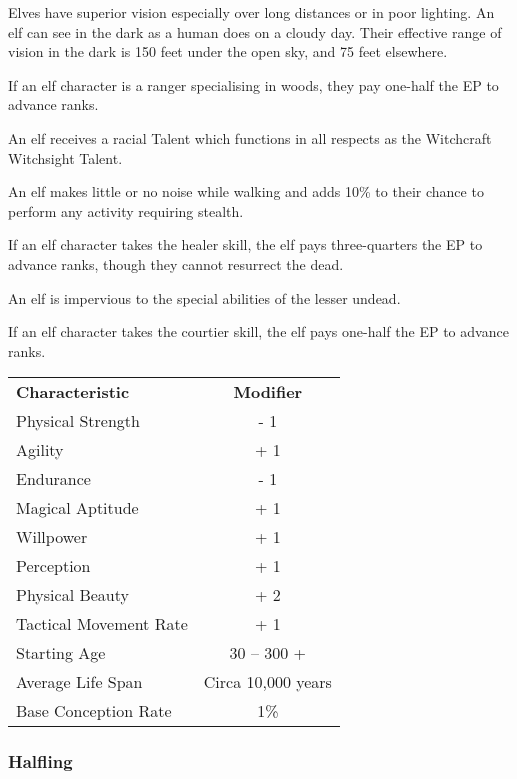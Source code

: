 \begin{multicols*}{3}
\begin{Enumerate}
\item
Elves have superior vision especially over long distances or in poor
lighting.  An elf can see in the dark as a human does on a cloudy
day. Their effective range of vision in the dark is 150 feet under the
open sky, and 75 feet elsewhere.

\item
If an elf character is a ranger specialising in woods, they pay
one-half the EP to advance ranks.

\item
An elf receives a racial Talent which functions in all respects as the
Witchcraft Witchsight Talent.

\item
An elf makes little or no noise while walking and adds 10\% to their
chance to perform any activity requiring stealth.

\item
If an elf character takes the healer skill, the elf pays
three-quarters the EP to advance ranks, though they cannot resurrect
the dead.

\item
An elf is impervious to the special abilities of the lesser undead.

\item
If an elf character takes the courtier skill, the elf pays one-half
the EP to advance ranks.
\end{Enumerate}

\begin{tabularx}{\linewidth}{Xc}
\textbf{Characteristic} & \textbf{Modifier} \\
Physical Strength	& - 1 \\
Agility			& + 1 \\
Endurance		& - 1 \\
Magical Aptitude	& + 1 \\
Willpower		& + 1 \\
Perception		& + 1 \\
Physical Beauty		& + 2 \\
Tactical Movement Rate	& + 1 \\
Starting Age		& 30 -- 300 + \\
Average Life Span	& Circa 10,000 years \\
Base Conception Rate	& 1\% \\
\end{tabularx}

\subsubsection{Halfling}


\end{multicols*}
